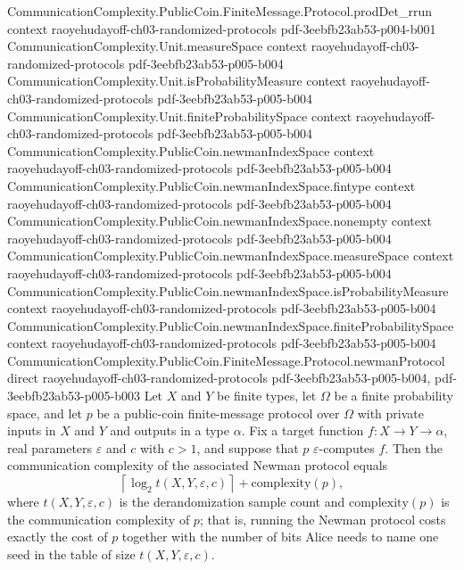 \begin{theorem}
  {CommunicationComplexity.PublicCoin.FiniteMessage.Protocol.prodDet_rrun}
  {context}
  {raoyehudayoff-ch03-randomized-protocols}
  {pdf-3eebfb23ab53-p004-b001}
\proofstep
  {CommunicationComplexity.Unit.measureSpace}
  {context}
  {raoyehudayoff-ch03-randomized-protocols}
  {pdf-3eebfb23ab53-p005-b004}
\proofstep
  {CommunicationComplexity.Unit.isProbabilityMeasure}
  {context}
  {raoyehudayoff-ch03-randomized-protocols}
  {pdf-3eebfb23ab53-p005-b004}
\proofstep
  {CommunicationComplexity.Unit.finiteProbabilitySpace}
  {context}
  {raoyehudayoff-ch03-randomized-protocols}
  {pdf-3eebfb23ab53-p005-b004}
\proofstep
  {CommunicationComplexity.PublicCoin.newmanIndexSpace}
  {context}
  {raoyehudayoff-ch03-randomized-protocols}
  {pdf-3eebfb23ab53-p005-b004}
\proofstep
  {CommunicationComplexity.PublicCoin.newmanIndexSpace.fintype}
  {context}
  {raoyehudayoff-ch03-randomized-protocols}
  {pdf-3eebfb23ab53-p005-b004}
\proofstep
  {CommunicationComplexity.PublicCoin.newmanIndexSpace.nonempty}
  {context}
  {raoyehudayoff-ch03-randomized-protocols}
  {pdf-3eebfb23ab53-p005-b004}
\proofstep
  {CommunicationComplexity.PublicCoin.newmanIndexSpace.measureSpace}
  {context}
  {raoyehudayoff-ch03-randomized-protocols}
  {pdf-3eebfb23ab53-p005-b004}
\proofstep
  {CommunicationComplexity.PublicCoin.newmanIndexSpace.isProbabilityMeasure}
  {context}
  {raoyehudayoff-ch03-randomized-protocols}
  {pdf-3eebfb23ab53-p005-b004}
\proofstep
  {CommunicationComplexity.PublicCoin.newmanIndexSpace.finiteProbabilitySpace}
  {context}
  {raoyehudayoff-ch03-randomized-protocols}
  {pdf-3eebfb23ab53-p005-b004}
\proofstep
  {CommunicationComplexity.PublicCoin.FiniteMessage.Protocol.newmanProtocol}
  {direct}
  {raoyehudayoff-ch03-randomized-protocols}
  {pdf-3eebfb23ab53-p005-b004,
    pdf-3eebfb23ab53-p005-b003}
Let $X$ and $Y$ be finite types, let $\Omega$ be a finite probability space, and let $p$
be a public-coin finite-message protocol over $\Omega$ with private inputs in $X$ and
$Y$ and outputs in a type $\alpha$. Fix a target function $f : X \to Y \to \alpha$, real
parameters $\varepsilon$ and $c$ with $c > 1$, and suppose that $p$
$\varepsilon$-computes $f$. Then the communication complexity of the associated Newman
protocol equals
\[
  \left\lceil \log_2 t(X, Y, \varepsilon, c) \right\rceil + \mathrm{complexity}(p),
\]
where $t(X, Y, \varepsilon, c)$ is the derandomization sample count and
$\mathrm{complexity}(p)$ is the communication complexity of $p$; that is, running the
Newman protocol costs exactly the cost of $p$ together with the number of bits Alice
needs to name one seed in the table of size $t(X, Y, \varepsilon, c)$.
\end{theorem}

